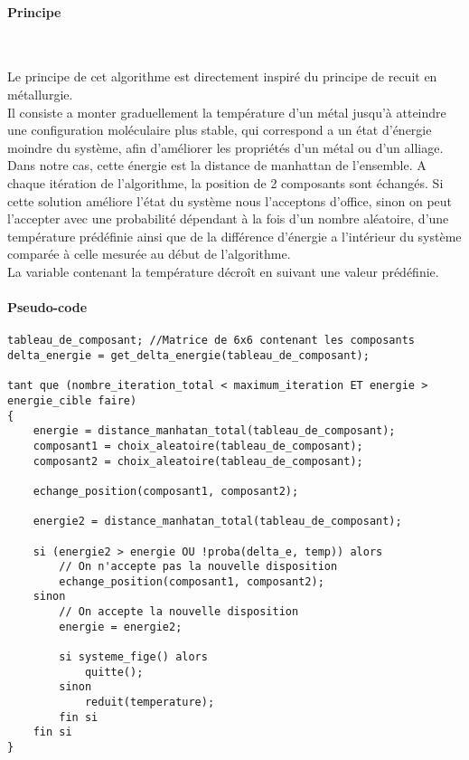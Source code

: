 \paragraph{Principe}

\\

\vspace{1mm}

\newline

\indent Le principe de cet algorithme est directement inspiré du principe de recuit en métallurgie.\\

Il consiste a monter graduellement la température d'un métal jusqu'à atteindre une configuration moléculaire plus stable, qui correspond a un état d'énergie moindre du système, afin d'améliorer les propriétés d'un métal ou d'un alliage.\\

Dans notre cas, cette énergie est la distance de manhattan de l'ensemble.
A chaque itération de l'algorithme, la position de 2 composants sont échangés. Si cette solution améliore l'état du système nous l'acceptons d'office, sinon on peut l'accepter avec une probabilité dépendant à la fois d'un nombre aléatoire, d'une température prédéfinie ainsi que de la différence d'énergie a l'intérieur du système comparée à celle mesurée au début de l'algorithme. \\

La variable contenant la température décroît en suivant une valeur prédéfinie.
\newpage
\paragraph{Pseudo-code}
\noindent
\begin{centering}


\begin{lstlisting}
tableau_de_composant; //Matrice de 6x6 contenant les composants
delta_energie = get_delta_energie(tableau_de_composant);

tant que (nombre_iteration_total < maximum_iteration ET energie > energie_cible faire)
{
	energie = distance_manhatan_total(tableau_de_composant);
	composant1 = choix_aleatoire(tableau_de_composant);
	composant2 = choix_aleatoire(tableau_de_composant);
	
	echange_position(composant1, composant2);
	
	energie2 = distance_manhatan_total(tableau_de_composant);
	
	si (energie2 > energie OU !proba(delta_e, temp)) alors
		// On n'accepte pas la nouvelle disposition
		echange_position(composant1, composant2);
	sinon
		// On accepte la nouvelle disposition
		energie = energie2;
		
		si systeme_fige() alors
		    quitte();
		sinon
		    reduit(temperature);
		fin si
	fin si
}
\end{lstlisting}
\end{centering}
\newpage
